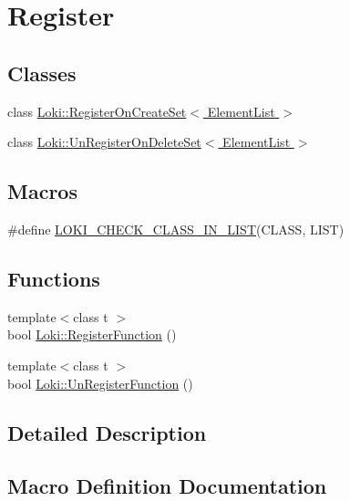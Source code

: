 \hypertarget{group__RegisterGroup}{}\section{Register}
\label{group__RegisterGroup}
\subsection*{Classes}
\begin{DoxyCompactItemize}
\item 
class \hyperlink{structLoki_1_1RegisterOnCreateSet}{Loki\+::\+Register\+On\+Create\+Set$<$ Element\+List $>$}
\item 
class \hyperlink{structLoki_1_1UnRegisterOnDeleteSet}{Loki\+::\+Un\+Register\+On\+Delete\+Set$<$ Element\+List $>$}
\end{DoxyCompactItemize}
\subsection*{Macros}
\begin{DoxyCompactItemize}
\item 
\#define \hyperlink{group__RegisterGroup_ga973626a76114ed9f6258b3af893b31bf}{L\+O\+K\+I\+\_\+\+C\+H\+E\+C\+K\+\_\+\+C\+L\+A\+S\+S\+\_\+\+I\+N\+\_\+\+L\+I\+S\+T}(C\+L\+A\+S\+S,  L\+I\+S\+T)                                                            
\end{DoxyCompactItemize}
\subsection*{Functions}
\begin{DoxyCompactItemize}
\item 
{\footnotesize template$<$class t $>$ }\\bool \hyperlink{group__RegisterGroup_ga801c6be20180074d02fcc0c3fc4909bd}{Loki\+::\+Register\+Function} ()
\item 
{\footnotesize template$<$class t $>$ }\\bool \hyperlink{group__RegisterGroup_gacf54fb9d602c1d1e05b3602333847ebf}{Loki\+::\+Un\+Register\+Function} ()
\end{DoxyCompactItemize}


\subsection{Detailed Description}


\subsection{Macro Definition Documentation}
\hypertarget{group__RegisterGroup_ga973626a76114ed9f6258b3af893b31bf}{}
